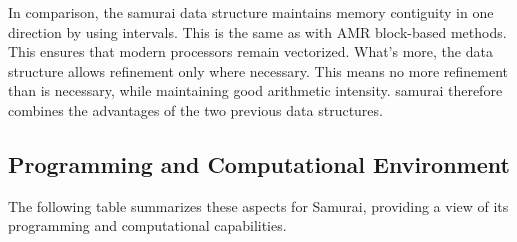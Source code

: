 In comparison, the samurai data structure maintains memory contiguity in one direction by using intervals. This is the same as with AMR block-based methods. This ensures that modern processors remain vectorized. What's more, the data structure allows refinement only where necessary. This means no more refinement than is necessary, while maintaining good arithmetic intensity. samurai therefore combines the advantages of the two previous data structures.

\subsection{Programming and Computational Environment}
\label{sec::Samurai:environment_capabilities}


The following table summarizes these aspects for Samurai, providing a  view of its programming and computational capabilities.

